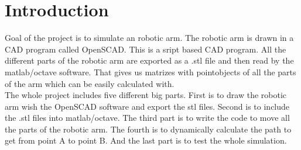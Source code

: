 \chapter{Introduction}

Goal of the project is to simulate an robotic arm. The robotic arm is drawn in a CAD program called OpenSCAD. This is a sript based CAD program. All the different parts of the robotic arm are exported as a .stl file and then read by the matlab/octave software. That gives us matrizes with pointobjects of all the parts of the arm which can be easily calculated with.\\
The whole project includes five different big parts. First is to draw the robotic arm wish the OpenSCAD software and export the stl files. Second is to include the .stl files into matlab/octave. The third part is to write the code to move all the parts of the robotic arm. The fourth is to dynamically calculate the path to get from point A to point B. And the last part is to test the whole simulation.\\
\pagebreak
